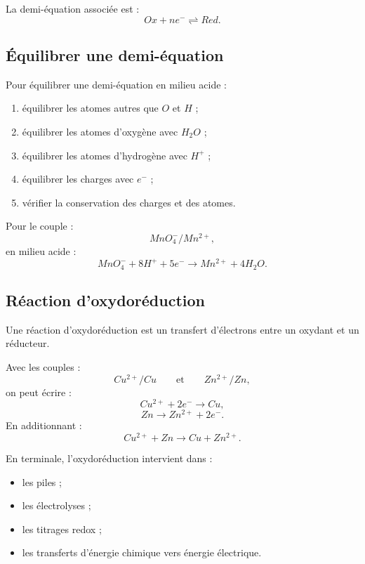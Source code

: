 \documentclass[11pt,a4paper]{article}
\begin{document}
La demi-équation associée est :
\[
Ox+ne^- \rightleftharpoons Red.
\]

\subsection{Équilibrer une demi-équation}

\begin{methode}
Pour équilibrer une demi-équation en milieu acide :
\begin{enumerate}
  \item équilibrer les atomes autres que $O$ et $H$ ;
  \item équilibrer les atomes d'oxygène avec $H_2O$ ;
  \item équilibrer les atomes d'hydrogène avec $H^+$ ;
  \item équilibrer les charges avec $e^-$ ;
  \item vérifier la conservation des charges et des atomes.
\end{enumerate}
\end{methode}

\begin{exemple}
Pour le couple :
\[
MnO_4^-/Mn^{2+},
\]
en milieu acide :
\[
MnO_4^-+8H^++5e^- \longrightarrow Mn^{2+}+4H_2O.
\]
\end{exemple}

\subsection{Réaction d'oxydoréduction}

Une réaction d'oxydoréduction est un transfert d'électrons entre un oxydant et un réducteur.

\begin{exemple}
Avec les couples :
\[
Cu^{2+}/Cu
\qquad \text{et} \qquad
Zn^{2+}/Zn,
\]
on peut écrire :
\[
Cu^{2+}+2e^- \longrightarrow Cu,
\]
\[
Zn \longrightarrow Zn^{2+}+2e^-.
\]
En additionnant :
\[
Cu^{2+}+Zn \longrightarrow Cu+Zn^{2+}.
\]
\end{exemple}

\begin{transition}
En terminale, l'oxydoréduction intervient dans :
\begin{itemize}
  \item les piles ;
  \item les électrolyses ;
  \item les titrages redox ;
  \item les transferts d'énergie chimique vers énergie électrique.
\end{itemize}
\end{transition}
\end{document}
